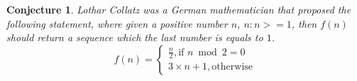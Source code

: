 \usepackage{algorithm2e}
\usepackage{listings}

\newtheorem{conjecture}[theorem]{Conjecture}
\newtheorem{lemma}[theorem]{Lemma}



\begin{conjecture}

Lothar Collatz was a German mathematician that proposed the following statement, where given a positive number $n$, $n : n >= 1$, then $f(n)$ should return a sequence which the last number is equals to $1$.
\[
    f(n) =
    \begin{cases}
        \frac{n}{2}, \text{if } n \bmod{2} = 0\\
        3 \times n + 1, \text{otherwise}
    \end{cases}
\]
\end{conjecture}

